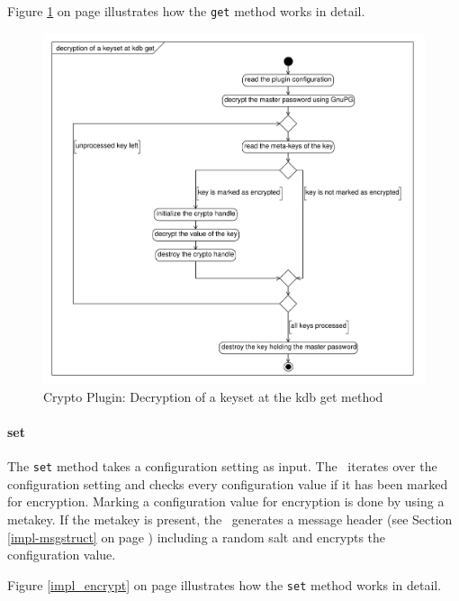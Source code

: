 Figure \ref{impl_decrypt} on page \pageref{impl_decrypt} illustrates how the \texttt{get} method works in detail.

\begin{figure}[h]
\center
\caption{Crypto Plugin: Decryption of a keyset at the kdb get method}
\label{impl_decrypt}
\includegraphics[width=15.0cm]{umlet-figures/impl_decrypt.pdf}
\end{figure}


\paragraph*{set}
The \texttt{set} method takes a configuration setting as input.
The \crypto ~iterates over the configuration setting and checks every configuration value if it has been marked for encryption.
Marking a configuration value for encryption is done by using a metakey.
If the metakey is present, the \crypto ~generates a message header (see Section \ref{impl-msgstruct} on page \pageref{impl-msgstruct}) including a random salt and encrypts the configuration value.

Figure \ref{impl_encrypt} on page \pageref{impl_encrypt} illustrates how the \texttt{set} method works in detail.

